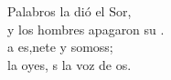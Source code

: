 \begin{cancion}[La Palabra][]%
	 Palabros la dió el Sor, \\
	y los hombres apagaron su .\\
	a es,nete y somoss;\\
	 la oyes, s la voz de os.\\
\end{cancion}%
